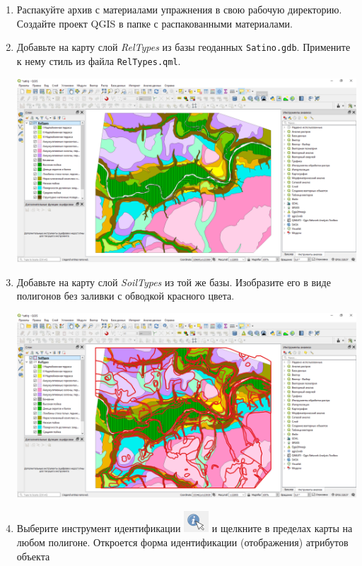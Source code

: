 \documentclass[
  12pt,
]{book}
\begin{document}
\begin{enumerate}
\def\labelenumi{\arabic{enumi}.}
\item
  Распакуйте архив с материалами упражнения в свою рабочую директорию. Создайте проект QGIS в папке с распакованными материалами.
\item
  Добавьте на карту слой \emph{RelTypes} из базы геоданных \texttt{Satino.gdb}. Примените к нему стиль из файла \texttt{RelTypes.qml}.

  \includegraphics{images/Ex06/AppliedStyle1.png}
\item
  Добавьте на карту слой \emph{SoilTypes} из той же базы. Изобразите его в виде полигонов без заливки с обводкой красного цвета.

  \includegraphics{images/Ex06/AppliedStyle2.png}
\item
  Выберите инструмент идентификации \includegraphics{images/Ex06/icon_identify.png} и щелкните в пределах карты на любом полигоне. Откроется форма идентификации (отображения) атрибутов объекта


\end{enumerate}
\end{document}
